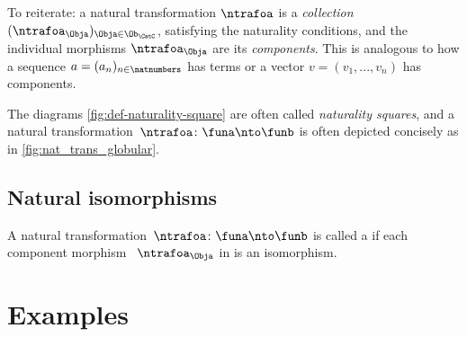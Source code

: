 To reiterate: a natural transformation $\ntrafoa$ is a \emph{collection} $(\ntrafoa_\Obja)_{\Obja \in \Ob_\CatC}$, satisfying the naturality conditions, and the individual morphisms $\ntrafoa_\Obja$ are its \emph{components}.
This is analogous to how a sequence $a = (a_n)_{n \in \natnumbers}$ has terms or a vector $v = (v_1, .
    .. , v_n)$ has components.

The diagrams \cref{fig:def-naturality-square} are often called \emph{naturality squares}, and a natural transformation~$\ntrafoa \colon \funa\nto \funb$ is often depicted concisely as in \cref{fig:nat_trans_globular}.

\begin{marginfigure}
    \centering
    \caption{}
    \label{fig:nat_trans_globular}
\end{marginfigure}
\begin{figure}[h!]
    \centering
    \begin{ctdefinitionshade}
    \end{ctdefinitionshade}
    \caption{}
    \label{fig:nat_trans_graphically}
\end{figure}

\subsection{Natural isomorphisms}

\begin{ctdefinition}
    \label{def:nat_iso}
    A natural transformation~$\ntrafoa \colon \funa \nto \funb $ is called a \emph{} if each component morphism ~$\ntrafoa_\Obja$ in \CatD is an isomorphism.
\end{ctdefinition}
\clearpage

\section{Examples}

